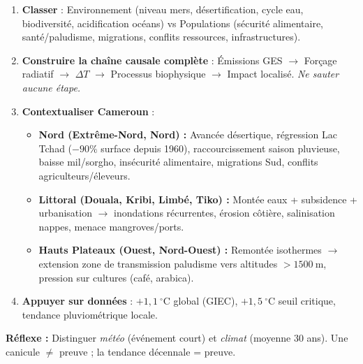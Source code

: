\documentclass[11pt]{article}
\begin{document}
\begin{methode}
\begin{enumerate}
\item \textbf{Classer} : Environnement (niveau mers, désertification, cycle eau, biodiversité, acidification océans) vs Populations (sécurité alimentaire, santé/paludisme, migrations, conflits ressources, infrastructures).
\item \textbf{Construire la chaîne causale complète} : Émissions GES $\rightarrow$ Forçage radiatif $\rightarrow$ $\Delta T$ $\rightarrow$ Processus biophysique $\rightarrow$ Impact localisé. \emph{Ne sauter aucune étape.}
\item \textbf{Contextualiser Cameroun} :
\begin{itemize}
\item \textbf{Nord (Extrême-Nord, Nord) :} Avancée désertique, régression Lac Tchad ($-90\%$ surface depuis 1960), raccourcissement saison pluvieuse, baisse mil/sorgho, insécurité alimentaire, migrations Sud, conflits agriculteurs/éleveurs.
\item \textbf{Littoral (Douala, Kribi, Limbé, Tiko) :} Montée eaux + subsidence + urbanisation $\rightarrow$ inondations récurrentes, érosion côtière, salinisation nappes, menace mangroves/ports.
\item \textbf{Hauts Plateaux (Ouest, Nord-Ouest) :} Remontée isothermes $\rightarrow$ extension zone de transmission paludisme vers altitudes $>1500\ \text{m}$, pression sur cultures (café, arabica).
\end{itemize}
\item \textbf{Appuyer sur données} : $+1{,}1\ ^\circ\text{C}$ global (GIEC), $+1{,}5\ ^\circ\text{C}$ seuil critique, tendance pluviométrique locale.
\end{enumerate}
\textbf{Réflexe :} Distinguer \emph{météo} (événement court) et \emph{climat} (moyenne 30 ans). Une canicule $\neq$ preuve ; la tendance décennale = preuve.
\end{methode}
\end{document}

